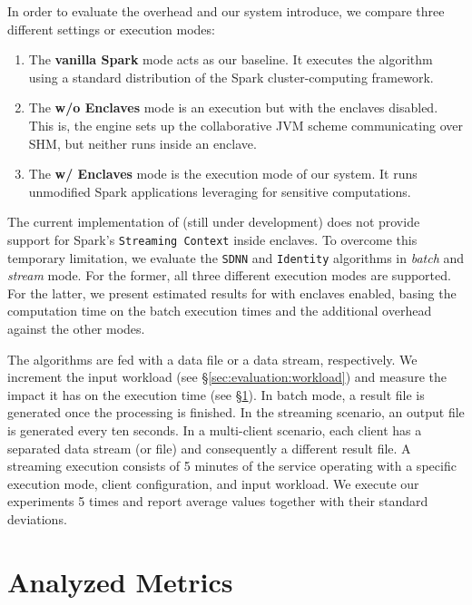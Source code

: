 In order to evaluate the overhead \sgxspark and our system introduce, we compare three different settings or execution modes:
\begin{enumerate}
    \item The \textbf{vanilla Spark} mode acts as our baseline. It executes the algorithm using a standard distribution of the Spark cluster-computing framework.
    \item The \textbf{\sgxspark w/o Enclaves} mode is an \sgxspark execution but with the enclaves disabled. This is, the engine sets up the collaborative JVM scheme communicating over SHM, but neither runs inside an enclave.
    \item The \textbf{\sgxspark w/ Enclaves} mode is the execution mode of our system. It runs unmodified Spark applications leveraging \sgx for sensitive computations.
\end{enumerate}
The current implementation of \sgxspark (still under development) does not provide support for Spark's \texttt{Streaming Context} inside enclaves. 
To overcome this temporary limitation, we evaluate the \texttt{SDNN} and \texttt{Identity} algorithms in \emph{batch} and \emph{stream} mode. 
For the former, all three different execution modes are supported.
For the latter, we present estimated results for \sgxspark with enclaves enabled, basing the computation time on the batch execution times and the additional overhead against the other modes.

The algorithms are fed with a data file or a data stream, respectively.
We increment the input workload (see \S\ref{sec:evaluation:workload}) and measure the impact it has on the execution time (see \S\ref{sec:evaluation:metrics}).
In batch mode, a result file is generated once the processing is finished.
In the streaming scenario, an output file is generated every ten seconds.
In a multi-client scenario, each client has a separated data stream (or file) and consequently a different result file.
A streaming execution consists of 5 minutes of the service operating with a specific execution mode, client configuration, and input workload.
We execute our experiments 5 times and report average values together with their standard deviations.

\section{Analyzed Metrics} \label{sec:evaluation:metrics}

